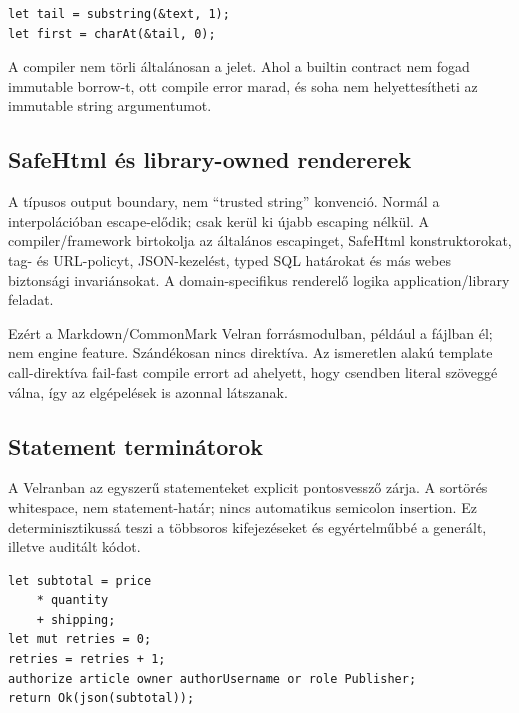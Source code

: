 \begin{lstlisting}[language=Velran]
let tail = substring(&text, 1);
let first = charAt(&tail, 0);
\end{lstlisting}

A compiler nem törli általánosan a \code{\&} jelet. Ahol a builtin contract nem fogad immutable borrow-t, ott compile error marad, és  soha nem helyettesítheti az immutable string argumentumot.

\subsection*{SafeHtml és library-owned rendererek}

A  típusos output boundary, nem ``trusted string'' konvenció. Normál  a  interpolációban escape-elődik; csak  kerül ki újabb escaping nélkül. A compiler/framework birtokolja az általános escapinget, SafeHtml konstruktorokat, tag- és URL-policyt, JSON-kezelést, typed SQL határokat és más webes biztonsági invariánsokat. A domain-specifikus renderelő logika application/library feladat.

Ezért a Markdown/CommonMark Velran forrásmodulban, például a  fájlban él; nem engine feature. Szándékosan nincs  direktíva. Az ismeretlen  alakú template call-direktíva fail-fast compile errort ad ahelyett, hogy csendben literal szöveggé válna, így az elgépelések is azonnal látszanak.


\subsection*{Statement terminátorok}

A Velranban az egyszerű statementeket explicit pontosvessző zárja. A sortörés whitespace, nem statement-határ; nincs automatikus semicolon insertion. Ez determinisztikussá teszi a többsoros kifejezéseket és egyértelműbbé a generált, illetve auditált kódot.

\begin{lstlisting}[language=Velran]
let subtotal = price
    * quantity
    + shipping;
let mut retries = 0;
retries = retries + 1;
authorize article owner authorUsername or role Publisher;
return Ok(json(subtotal));
\end{lstlisting}


